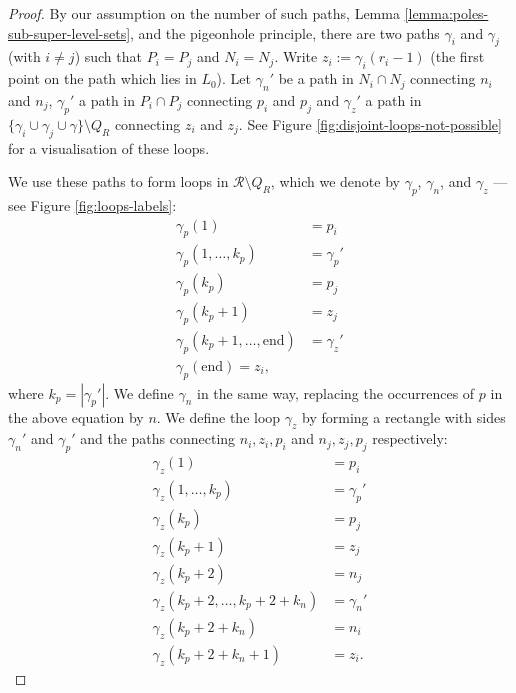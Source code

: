 \documentclass[12pt]{amsart}
\numberwithin{equation}{section}
\begin{document}
\begin{proof}
		By our assumption on the number of such paths, Lemma \ref{lemma:poles-sub-super-level-sets}, and the pigeonhole principle, there are two paths $\gamma_i$ and $\gamma_{j}$ (with $i \neq j$) such that $P_i = P_{j}$ and $N_i = N_{j}$. Write $z_i := \gamma_i(r_i-1)$ (the first point on the path which lies in $L_0$). Let $\gamma_n'$ be a path in $N_i \cap N_{j}$ connecting $n_i$ and $n_{j}$,  $\gamma_p'$ a path in $P_i \cap P_{j}$ connecting  
		$p_i$ and $p_{j}$ and $\gamma_z'$ a path in $\{\gamma_i \cup \gamma_{j} \cup \gamma\} \setminus Q_R$ connecting $z_i$ and $z_{j}$. 
		See Figure \ref{fig:disjoint-loops-not-possible} for a visualisation of these loops. 
		
		We use these paths to form loops in $\mathcal{R} \setminus Q_R$, which we denote by $\gamma_p$, $\gamma_n$, and  $\gamma_z$ --- see Figure \ref{fig:loops-labels}: 
		\begin{equation} \label{eq:p-loop}
			\begin{aligned}
				\gamma_p(1) &= p_i \\
				\gamma_p(1, \ldots, k_p) &= \gamma_p'  \\
				\gamma_p(k_p) &= p_{j} \\
				\gamma_p(k_p+1) &= z_{j} \\
				\gamma_p(k_p+1, \ldots, \mathrm{end}) &= \gamma_z' \\
				\gamma_p(\mathrm{end}) = z_i ,
			\end{aligned}
		\end{equation}
		where $k_p = |\gamma_p'|$. We define $\gamma_n$ in the same way, replacing the occurrences of $p$ in the above equation by $n$. 
		We define the loop $\gamma_z$ by forming a rectangle with sides $\gamma_n'$ and $\gamma_p'$ and the paths connecting $n_i, z_i, p_i$ and $n_{j}, z_{j}, p_{j}$ respectively: 
		\begin{equation} \label{eq:z-loop}
			\begin{aligned}
				\gamma_z(1) &= p_i \\
				\gamma_z(1, \ldots, k_p) &= \gamma_p'  \\
				\gamma_z(k_p) &= p_{j} \\
				\gamma_z(k_p + 1) &= z_{j} \\
				\gamma_z(k_p + 2) &= n_{j} \\
				\gamma_z(k_p + 2, \ldots, k_p + 2 + k_n) &= \gamma_n' \\
				\gamma_z(k_p + 2 + k_n) &= n_i \\
				\gamma_z(k_p + 2 + k_n + 1) &= z_i   .
			\end{aligned}
		\end{equation}
		

\end{proof}
\end{document}
